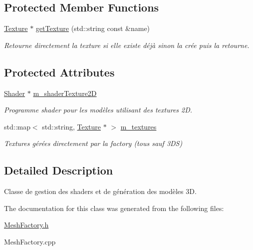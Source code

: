 \subsection*{Protected Member Functions}
\begin{DoxyCompactItemize}
\item 
\hypertarget{classMeshFactory_ae8037c270e2e37be03cc5dcc7f5c5d58}{\hyperlink{classTexture}{Texture} $\ast$ \hyperlink{classMeshFactory_ae8037c270e2e37be03cc5dcc7f5c5d58}{get\+Texture} (std\+::string const \&name)}\label{classMeshFactory_ae8037c270e2e37be03cc5dcc7f5c5d58}

\begin{DoxyCompactList}\small\item\em Retourne directement la texture si elle existe déjà sinon la crée puis la retourne. \end{DoxyCompactList}\end{DoxyCompactItemize}
\subsection*{Protected Attributes}
\begin{DoxyCompactItemize}
\item 
\hypertarget{classMeshFactory_a49c1212540dc91ab923efc1d02e305b9}{\hyperlink{classShader}{Shader} $\ast$ \hyperlink{classMeshFactory_a49c1212540dc91ab923efc1d02e305b9}{m\+\_\+shader\+Texture2\+D}}\label{classMeshFactory_a49c1212540dc91ab923efc1d02e305b9}

\begin{DoxyCompactList}\small\item\em Programme shader pour les modèles utilisant des textures 2\+D. \end{DoxyCompactList}\item 
\hypertarget{classMeshFactory_a68d434125dbe5a1c7a7772602d5e77fd}{std\+::map$<$ std\+::string, \hyperlink{classTexture}{Texture} $\ast$ $>$ \hyperlink{classMeshFactory_a68d434125dbe5a1c7a7772602d5e77fd}{m\+\_\+textures}}\label{classMeshFactory_a68d434125dbe5a1c7a7772602d5e77fd}

\begin{DoxyCompactList}\small\item\em Textures gérées directement par la factory (tous sauf 3\+D\+S) \end{DoxyCompactList}\end{DoxyCompactItemize}


\subsection{Detailed Description}
Classe de gestion des shaders et de génération des modèles 3\+D. 

The documentation for this class was generated from the following files\+:\begin{DoxyCompactItemize}
\item 
\hyperlink{MeshFactory_8h}{Mesh\+Factory.\+h}\item 
Mesh\+Factory.\+cpp\end{DoxyCompactItemize}
